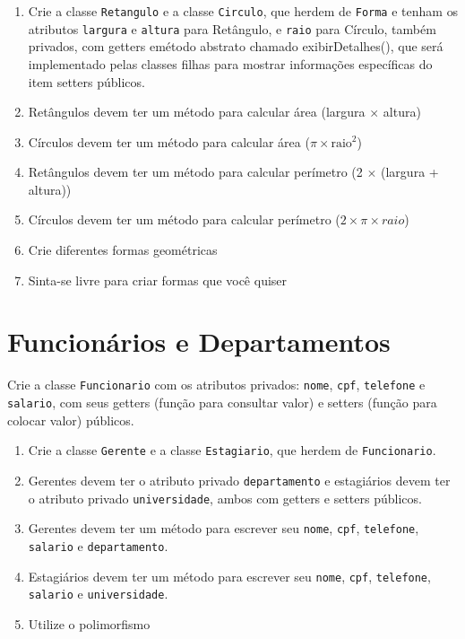 \documentclass{article}
\begin{document}
\begin{enumerate}
    \item Crie a classe \texttt{Retangulo} e a classe \texttt{Circulo}, que herdem de \texttt{Forma} e tenham os atributos
          \texttt{largura} e \texttt{altura} para Retângulo, e \texttt{raio} para Círculo, também privados, com getters emétodo abstrato chamado exibirDetalhes(), que será implementado pelas classes filhas para mostrar informações específicas do item setters públicos.
    \item Retângulos devem ter um método para calcular área (largura $×$ altura)
    \item Círculos devem ter um método para calcular área ($\pi \times \textrm{raio}^2$)
    \item Retângulos devem ter um método para calcular perímetro (2 $×$ (largura + altura))
    \item Círculos devem ter um método para calcular perímetro ($2 \times \pi \times raio$)
    \item Crie diferentes formas geométricas
    \item Sinta-se livre para criar formas que você quiser

\end{enumerate}

\section{Funcionários e Departamentos}
Crie a classe \texttt{Funcionario} com os atributos privados: \texttt{nome}, \texttt{cpf}, \texttt{telefone} e
\texttt{salario}, com seus getters (função para consultar valor) e setters (função para colocar valor) públicos.

\begin{enumerate}
    \item Crie a classe \texttt{Gerente} e a classe \texttt{Estagiario}, que herdem de \texttt{Funcionario}.
    \item Gerentes devem ter o atributo privado \texttt{departamento} e estagiários devem ter o atributo privado \texttt{universidade}, ambos com getters e setters públicos.
    \item Gerentes devem ter um método para escrever seu  \texttt{nome}, \texttt{cpf}, \texttt{telefone},
          \texttt{salario} e \texttt{departamento}.
    \item Estagiários devem ter um método para escrever seu  \texttt{nome}, \texttt{cpf}, \texttt{telefone},
          \texttt{salario} e \texttt{universidade}.
    \item Utilize o polimorfismo

\end{enumerate}
\end{document}
